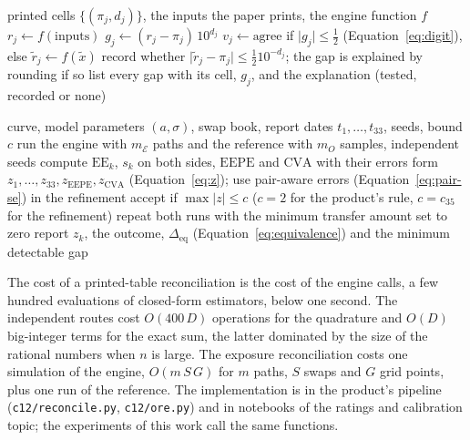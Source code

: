 \begin{algorithm}[htbp]
\caption{Reconcile a printed table with the engine and test the rounding explanation.}
\label{alg:printed}
\begin{algorithmic}[1]
\Require printed cells $\{(\pi_j,d_j)\}$, the inputs the paper prints, the engine function $f$
  \State $r_j \gets f(\text{inputs})$ 
  \State $g_j \gets (r_j-\pi_j)\,10^{d_j}$ 
  \State $v_j \gets \text{agree}$ if $\lvert g_j\rvert\le\tfrac12$ (Equation~\eqref{eq:digit}), else 
\EndFor
{}
  \State $\tilde{r}_j \gets f(\tilde{x})$ 
  \State record whether $\lvert\tilde{r}_j-\pi_j\rvert\le\tfrac12 10^{-d_j}$; the gap is explained by rounding if so
\EndFor
\State list every gap with its cell, $g_j$, and the explanation (tested, recorded or none)
\end{algorithmic}
\end{algorithm}

\begin{algorithm}[htbp]
\caption{Reconcile the exposure engine with a Monte Carlo reference engine.}
\label{alg:engine}
\begin{algorithmic}[1]
\Require curve, model parameters $(a,\sigma)$, swap book, report dates $t_1,\dots,t_{33}$, seeds, bound $c$
\State run the engine with $m_{\mathcal{E}}$ paths and the reference with $m_{O}$ samples, independent seeds
\State compute $\mathrm{EE}_k$, $s_k$ on both sides, $\mathrm{EEPE}$ and $\mathrm{CVA}$ with their errors
\State form $z_1,\dots,z_{33},z_{\mathrm{EEPE}},z_{\mathrm{CVA}}$ (Equation~\eqref{eq:z}); use pair-aware errors (Equation~\eqref{eq:pair-se}) in the refinement
\State accept if $\max\lvert z\rvert\le c$ ($c=2$ for the product's rule, $c=c_{35}$ for the refinement)
 \State repeat both runs with the minimum transfer amount set to zero \EndIf
\State report $z_k$, the outcome, $\Delta_{\mathrm{eq}}$ (Equation~\eqref{eq:equivalence}) and the minimum detectable gap
\end{algorithmic}
\end{algorithm}

The cost of a printed-table reconciliation is the cost of the engine calls, a few hundred evaluations of closed-form estimators, below one second. The independent routes cost $O(400\,D)$ operations for the quadrature and $O(D)$ big-integer terms for the exact sum, the latter dominated by the size of the rational numbers when $n$ is large. The exposure reconciliation costs one simulation of the engine, $O(m\,S\,G)$ for $m$ paths, $S$ swaps and $G$ grid points, plus one run of the reference. The implementation is in the product's pipeline (\texttt{c12/reconcile.py}, \texttt{c12/ore.py}) and in notebooks of the ratings and calibration topic; the experiments of this work call the same functions.
